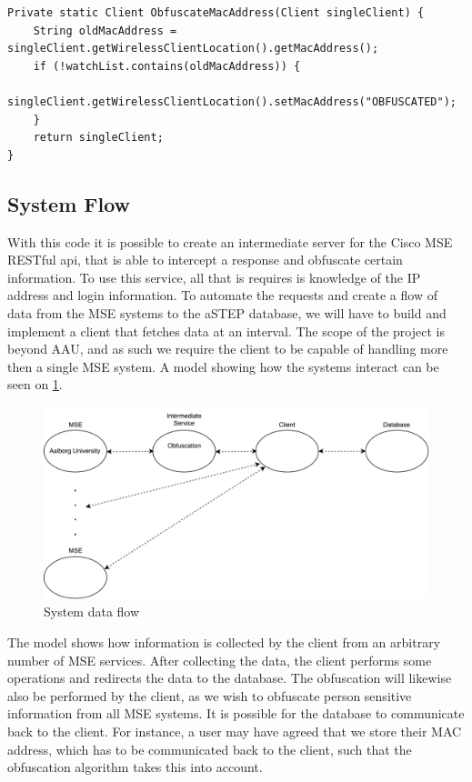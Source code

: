 \begin{lstlisting}[caption={Obfuscating MAC address},label={lst:obfuscating_mac},language=inc_Java]
Private static Client ObfuscateMacAddress(Client singleClient) {
    String oldMacAddress = singleClient.getWirelessClientLocation().getMacAddress();
    if (!watchList.contains(oldMacAddress)) {
        singleClient.getWirelessClientLocation().setMacAddress("OBFUSCATED");
    }
    return singleClient;
}
\end{lstlisting}

\subsection*{System Flow}\label{subsec:system_hierarchy}
With this code it is possible to create an intermediate server for the Cisco MSE RESTful api, that is able to intercept a response and obfuscate certain information. To use this service, all that is requires is knowledge of the IP address and login information. To automate the requests and create a flow of data from the MSE systems to the aSTEP database, we will have to build and implement a client that fetches data at an interval. The scope of the project is beyond AAU, and as such we require the client to be capable of handling more then a single MSE system. A model showing how the systems interact can be seen on \cref{fig:system_flow}.
\begin{figure}[ht]
	\begin{center}
		\includegraphics[scale=0.7]{graphics/ciscoNew.pdf}
		\caption{System data flow}
		\label{fig:system_flow}
	\end{center}
\end{figure}
The model shows how information is collected by the client from an arbitrary number of MSE services. After collecting the data, the client performs some operations and redirects the data to the database. The obfuscation will likewise also be performed by the client, as we wish to obfuscate person sensitive information from all MSE systems. It is possible for the database to communicate back to the client. For instance, a user may have agreed that we store their MAC address, which has to be communicated back to the client, such that the obfuscation algorithm takes this into account.

